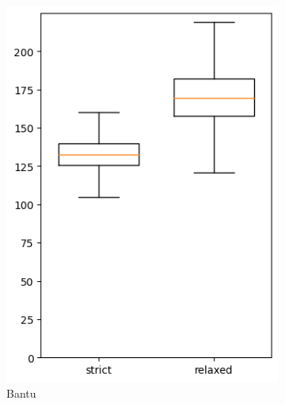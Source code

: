 \documentclass[]{rsos}%
\begin{document}
\begin{figure}
\begin{subfigure}{0.4\textwidth}
    \includegraphics[width=\textwidth]{supplement/analysis/bantu_years_per_split.png}
    \caption{Bantu}
  \end{subfigure}
  \begin{subfigure}{0.4\textwidth}

\end{subfigure}
\end{figure}
\end{document}
